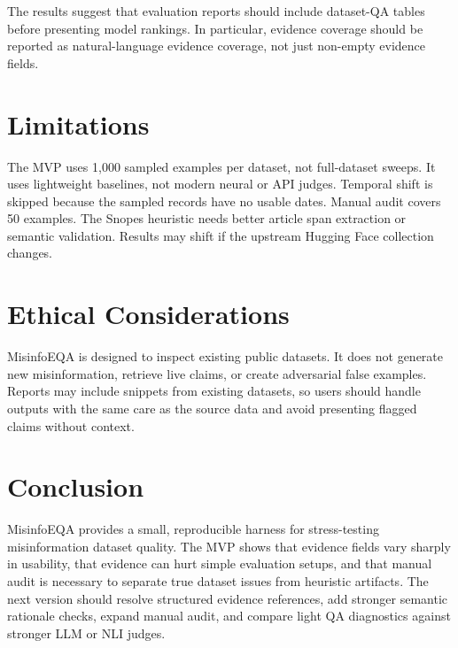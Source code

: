\documentclass[11pt]{article}
\begin{document}
The results suggest that evaluation reports should include dataset-QA tables
before presenting model rankings. In particular, evidence coverage should be
reported as natural-language evidence coverage, not just non-empty evidence
fields.

\section{Limitations}

The MVP uses 1,000 sampled examples per dataset, not full-dataset sweeps. It uses
lightweight baselines, not modern neural or API judges. Temporal shift is skipped
because the sampled records have no usable dates. Manual audit covers 50
examples. The Snopes heuristic needs better article span extraction or semantic
validation. Results may shift if the upstream Hugging Face collection changes.

\section{Ethical Considerations}

MisinfoEQA is designed to inspect existing public datasets. It does not generate
new misinformation, retrieve live claims, or create adversarial false examples.
Reports may include snippets from existing datasets, so users should handle
outputs with the same care as the source data and avoid presenting flagged
claims without context.

\section{Conclusion}

MisinfoEQA provides a small, reproducible harness for stress-testing
misinformation dataset quality. The MVP shows that evidence fields vary sharply
in usability, that evidence can hurt simple evaluation setups, and that manual
audit is necessary to separate true dataset issues from heuristic artifacts. The
next version should resolve structured evidence references, add stronger
semantic rationale checks, expand manual audit, and compare light QA diagnostics
against stronger LLM or NLI judges.



\end{document}
